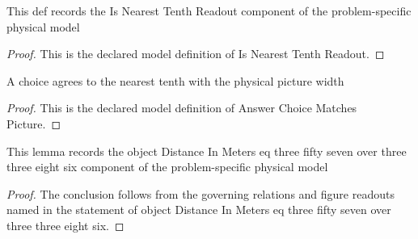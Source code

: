 \begin{definition}
  \label{def:physics:phyx-mini-0136:phyxminiproblems-problemphyxmini0136-isnearesttenthreadout}
  This def records the Is Nearest Tenth Readout component of the problem-specific physical model
\end{definition}
\begin{proof}
  This is the declared model definition of Is Nearest Tenth Readout.
\end{proof}
\begin{definition}
  \label{def:physics:phyx-mini-0136:phyxminiproblems-problemphyxmini0136-answerchoicematchespicture}
  A choice agrees to the nearest tenth with the physical picture width
\end{definition}
\begin{proof}
  This is the declared model definition of Answer Choice Matches Picture.
\end{proof}
\begin{lemma}
  \label{lem:physics:phyx-mini-0136:phyxminiproblems-problemphyxmini0136-objectdistanceinmeters-eq-three-fifty-seven-over-three-three-eight-six}
  This lemma records the object Distance In Meters eq three fifty seven over three three eight six component of the problem-specific physical model
\end{lemma}
\begin{proof}
  The conclusion follows from the governing relations and figure readouts named in the statement of object Distance In Meters eq three fifty seven over three three eight six.
\end{proof}
